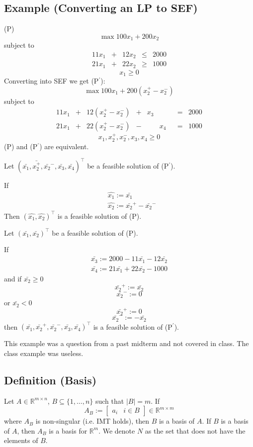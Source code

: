 \subsection{Example (Converting an LP to SEF)}
(P)
\[\max 100x_1+200x_2\]
subject to
\[
\begin{array}{ccccc}
    11x_1 & + & 12x_2 & \le & 2000\\
    21x_1 & + & 22x_2 & \ge & 1000
\end{array}
\]
\[x_1 \ge 0\]
Converting into SEF we get (P$^\prime$):
\[\max 100x_1+200(x_2^+-x_2^-)\]
subject to
\[
\begin{array}{ccccccccc}
    11x_1 & + & 12(x_2^+-x_2^-) & + & x_3 & & & = & 2000\\
    21x_1 & + & 22(x_2^+-x_2^-) & - & & x_4 & & = & 1000
\end{array}
\]
\[x_1,x_2^+,x_2^-,x_3,x_4\ge 0\]
(P) and (P$^\prime$) are equivalent.

Let
$(\bar{x_1}, \bar{x_2^+}, \bar{x_2}^-, \bar{x_3}, \bar{x_4})^\top$
be a feasible solution of (P$^\prime$).


If
\begin{align*}
    &\hat{x_1}:=\bar{x_1}\\
    &\hat{x_2}:=\bar{x_2}^+-\bar{x_2}^-
\end{align*}
Then 
$(\hat{x_1},\hat{x_2})^\top$
is a feasible solution of (P).

Let
$(\bar{x_1}, \bar{x_2})^\top$
be a feasible solution of (P).

If
\begin{align*}
    \bar{x_3}:=2000-11\bar{x_1}-12\bar{x_2}\\
    \bar{x_4}:=21\bar{x_1}+22\bar{x_2}-1000
\end{align*}
and 
if $\bar{x_2}\ge 0$
\[\bar{x_2}^+:=\bar{x_2}\]
\[\bar{x_2}^-:=0\]
or $\bar{x_2}< 0$
\[\bar{x_2}^+:=0\]
\[\bar{x_2}^-:=-\bar{x_2}\]
then $(\bar{x_1},\bar{x_2}^+,\bar{x_2}^-,\bar{x_3},\bar{x_4})^\top$
is a feasible solution of (P$^\prime$).
\begin{remark}
    This example was a question from a past midterm and not covered in class.
    The class example was useless.
\end{remark}

\begin{defbox}
    \subsection{Definition (Basis)}
    Let $A\in \mathbb{R}^{m\times n}$, $B\subseteq\{1,\dots,n\}$ such that $|B|=m$. If
    \[A_B:= \left[\begin{array}{c|c} a_i & i\in B \end{array}\right]
        \in \mathbb{R}^{m\times m}
    \]
    where $A_B$ is non-singular (i.e. IMT holds), then $B$ is a basis of $A$.
    If $B$ is a basis of $A$, then $A_B$ is a basis for $\mathbb{R}^m$. We
    denote $N$ as the set that does not have the elements of $B$.
\end{defbox}

